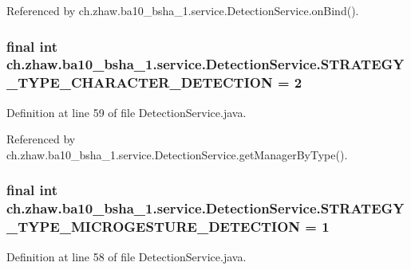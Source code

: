 Referenced by ch.zhaw.ba10\_\-bsha\_\-1.service.DetectionService.onBind().\hypertarget{classch_1_1zhaw_1_1ba10__bsha__1_1_1service_1_1DetectionService_a79f9a08bcebfb07d97dad403931d011d}{
\subsubsection[{STRATEGY\_\-TYPE\_\-CHARACTER\_\-DETECTION}]{\setlength{\rightskip}{0pt plus 5cm}final int {\bf ch.zhaw.ba10\_\-bsha\_\-1.service.DetectionService.STRATEGY\_\-TYPE\_\-CHARACTER\_\-DETECTION} = 2}}
\label{classch_1_1zhaw_1_1ba10__bsha__1_1_1service_1_1DetectionService_a79f9a08bcebfb07d97dad403931d011d}


Definition at line 59 of file DetectionService.java.

Referenced by ch.zhaw.ba10\_\-bsha\_\-1.service.DetectionService.getManagerByType().\hypertarget{classch_1_1zhaw_1_1ba10__bsha__1_1_1service_1_1DetectionService_acc8c85d6fe896611e64180360f6150b3}{
\subsubsection[{STRATEGY\_\-TYPE\_\-MICROGESTURE\_\-DETECTION}]{\setlength{\rightskip}{0pt plus 5cm}final int {\bf ch.zhaw.ba10\_\-bsha\_\-1.service.DetectionService.STRATEGY\_\-TYPE\_\-MICROGESTURE\_\-DETECTION} = 1}}
\label{classch_1_1zhaw_1_1ba10__bsha__1_1_1service_1_1DetectionService_acc8c85d6fe896611e64180360f6150b3}


Definition at line 58 of file DetectionService.java.

